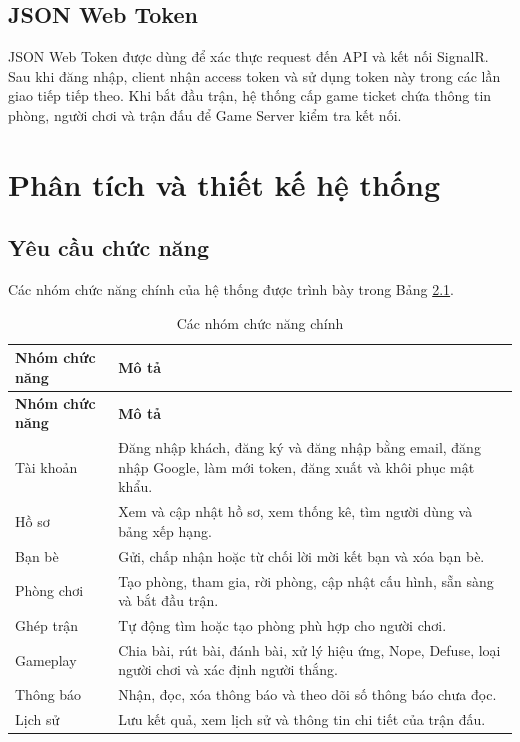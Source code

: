 \documentclass[a4paper]{report}
\begin{document}
\section{JSON Web Token}

JSON Web Token được dùng để xác thực request đến API và kết nối SignalR. Sau
khi đăng nhập, client nhận access token và sử dụng token này trong các lần giao
tiếp tiếp theo. Khi bắt đầu trận, hệ thống cấp game ticket chứa thông tin phòng,
người chơi và trận đấu để Game Server kiểm tra kết nối.

\chapter{Phân tích và thiết kế hệ thống}

\section{Yêu cầu chức năng}

Các nhóm chức năng chính của hệ thống được trình bày trong Bảng
\ref{tab:functions}.

\begin{longtable}{p{} p{}}
    \caption{Các nhóm chức năng chính}
    \label{tab:functions}                                                        \\
    \toprule
    \textbf{Nhóm chức năng} & \textbf{Mô tả}                                     \\
    \midrule
    \endfirsthead
    \toprule
    \textbf{Nhóm chức năng} & \textbf{Mô tả}                                     \\
    \midrule
    \endhead
    Tài khoản               &
    Đăng nhập khách, đăng ký và đăng nhập bằng email, đăng nhập Google, làm mới
    token, đăng xuất và khôi phục mật khẩu.                                      \\
    Hồ sơ                   &
    Xem và cập nhật hồ sơ, xem thống kê, tìm người dùng và bảng xếp hạng.        \\
    Bạn bè                  &
    Gửi, chấp nhận hoặc từ chối lời mời kết bạn và xóa bạn bè.                   \\
    Phòng chơi              &
    Tạo phòng, tham gia, rời phòng, cập nhật cấu hình, sẵn sàng và bắt đầu trận. \\
    Ghép trận               &
    Tự động tìm hoặc tạo phòng phù hợp cho người chơi.                           \\
    Gameplay                &
    Chia bài, rút bài, đánh bài, xử lý hiệu ứng, Nope, Defuse, loại người chơi
    và xác định người thắng.                                                     \\
    Thông báo               &
    Nhận, đọc, xóa thông báo và theo dõi số thông báo chưa đọc.                  \\
    Lịch sử                 &
    Lưu kết quả, xem lịch sử và thông tin chi tiết của trận đấu.                 \\
    \bottomrule
\end{longtable}
\end{document}
